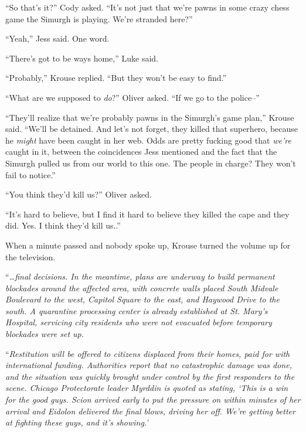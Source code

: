 ``So that's it?'' Cody asked.  ``It's not just that we're pawns in some crazy chess game the Simurgh is playing.  We're stranded here?''



``Yeah,'' Jess said.  One word.



``There's got to be ways home,'' Luke said.



``Probably,'' Krouse replied.  ``But they won't be easy to find.''



``What are we supposed to \emph{do}?'' Oliver asked.  ``If we go to the police--''



``They'll realize that we're probably pawns in the Simurgh's game plan,'' Krouse said.  ``We'll be detained.  And let's not forget, they killed that superhero, because he \emph{might} have been caught in her web.  Odds are pretty fucking good that \emph{we're} caught in it, between the coincidences Jess mentioned and the fact that the Simurgh pulled us from our world to this one.  The people in charge?  They won't fail to notice.''



``You think they'd kill us?'' Oliver asked.



``It's hard to believe, but I find it hard to believe they killed the cape and they did.  Yes.  I think they'd kill us..''



When a minute passed and nobody spoke up, Krouse turned the volume up for the television.



``\emph{\ldots{}final decisions.  In the meantime, plans are underway to build permanent blockades around the affected area, with concrete walls placed South Midvale Boulevard to the west, Capitol Square to the east, and Haywood Drive to the south.  A quarantine processing center is already established at St. Mary's Hospital, servicing city residents who were not evacuated before temporary blockades were set up.}



``\emph{Restitution will be offered to citizens displaced from their homes, paid for with international funding.  Authorities report that no catastrophic damage was done, and the situation was quickly brought under control by the first responders to the scene.  Chicago Protectorate leader Myrddin is quoted as stating, `This is a win for the good guys.  Scion arrived early to put the pressure on within minutes of her arrival and Eidolon delivered the final blows, driving her off.  We're getting better at fighting these guys, and it's showing.'}



